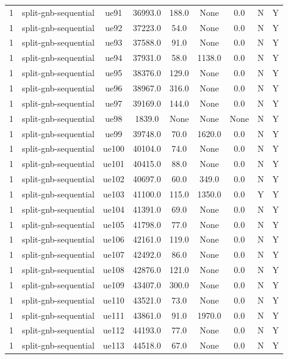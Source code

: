 \begin{table}[ht]
\begin{tabular}{|c|c|c|c|c|c|c|c|c|}
1 & split-gnb-sequential & ue91 & 36993.0 & 188.0 & None & 0.0 & N & Y \\
1 & split-gnb-sequential & ue92 & 37223.0 & 54.0 & None & 0.0 & N & Y \\
1 & split-gnb-sequential & ue93 & 37588.0 & 91.0 & None & 0.0 & N & Y \\
1 & split-gnb-sequential & ue94 & 37931.0 & 58.0 & 1138.0 & 0.0 & N & Y \\
1 & split-gnb-sequential & ue95 & 38376.0 & 129.0 & None & 0.0 & N & Y \\
1 & split-gnb-sequential & ue96 & 38967.0 & 316.0 & None & 0.0 & N & Y \\
1 & split-gnb-sequential & ue97 & 39169.0 & 144.0 & None & 0.0 & N & Y \\
1 & split-gnb-sequential & ue98 & 1839.0 & None & None & None & N & Y \\
1 & split-gnb-sequential & ue99 & 39748.0 & 70.0 & 1620.0 & 0.0 & N & Y \\
1 & split-gnb-sequential & ue100 & 40104.0 & 74.0 & None & 0.0 & N & Y \\
1 & split-gnb-sequential & ue101 & 40415.0 & 88.0 & None & 0.0 & N & Y \\
1 & split-gnb-sequential & ue102 & 40697.0 & 60.0 & 349.0 & 0.0 & N & Y \\
1 & split-gnb-sequential & ue103 & 41100.0 & 115.0 & 1350.0 & 0.0 & Y & Y \\
1 & split-gnb-sequential & ue104 & 41391.0 & 69.0 & None & 0.0 & N & Y \\
1 & split-gnb-sequential & ue105 & 41798.0 & 77.0 & None & 0.0 & N & Y \\
1 & split-gnb-sequential & ue106 & 42161.0 & 119.0 & None & 0.0 & N & Y \\
1 & split-gnb-sequential & ue107 & 42492.0 & 86.0 & None & 0.0 & N & Y \\
1 & split-gnb-sequential & ue108 & 42876.0 & 121.0 & None & 0.0 & N & Y \\
1 & split-gnb-sequential & ue109 & 43407.0 & 300.0 & None & 0.0 & N & Y \\
1 & split-gnb-sequential & ue110 & 43521.0 & 73.0 & None & 0.0 & N & Y \\
1 & split-gnb-sequential & ue111 & 43861.0 & 91.0 & 1970.0 & 0.0 & N & Y \\
1 & split-gnb-sequential & ue112 & 44193.0 & 77.0 & None & 0.0 & N & Y \\
1 & split-gnb-sequential & ue113 & 44518.0 & 67.0 & None & 0.0 & N & Y \\

\end{tabular}
\end{table}

